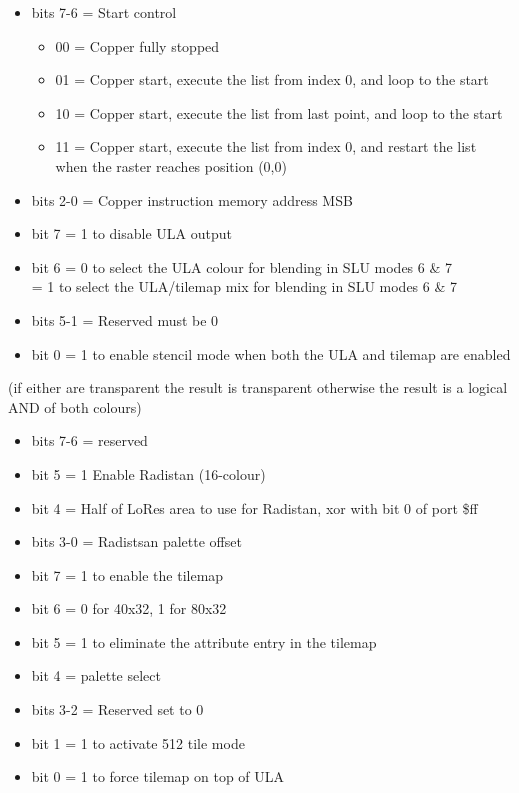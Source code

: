 \begin{itemize}
\item bits 7-6 = Start control
  \begin{itemize}
  \item[] 00 = Copper fully stopped
  \item[] 01 = Copper start, execute the list from index 0, and loop
    to the start
  \item[] 10 = Copper start, execute the list from last point, and
    loop to the start
  \item[] 11 = Copper start, execute the list from index 0, and
    restart the list when the raster reaches position (0,0)
  \end{itemize}
\item bits 2-0 = Copper instruction memory address MSB
\end{itemize}

\begin{itemize}
\item bit 7 = 1 to disable ULA output
\item bit 6 = 0 to select the ULA colour for blending in SLU modes 6
  \& 7\\
  = 1 to select the ULA/tilemap mix for blending in SLU modes 6 \& 7
\item bits 5-1 = Reserved must be 0
\item bit 0 = 1 to enable stencil mode when both the ULA and tilemap
  are enabled
\end{itemize}
(if either are transparent the result is transparent otherwise the
result is a logical AND of both colours)

\begin{itemize}
\item bits 7-6 = reserved
\item bit 5 = 1 Enable Radistan (16-colour)
\item bit 4 = Half of LoRes area to use for Radistan, xor with bit 0
  of port \$ff
\item bits 3-0 = Radistsan palette offset
\end{itemize}

\begin{itemize}
\item bit 7 = 1 to enable the tilemap
\item bit 6 = 0 for 40x32, 1 for 80x32
\item bit 5 = 1 to eliminate the attribute entry in the tilemap
\item bit 4 = palette select
\item bits 3-2 = Reserved set to 0
\item bit 1 = 1 to activate 512 tile mode
\item bit 0 = 1 to force tilemap on top of ULA
\end{itemize}

